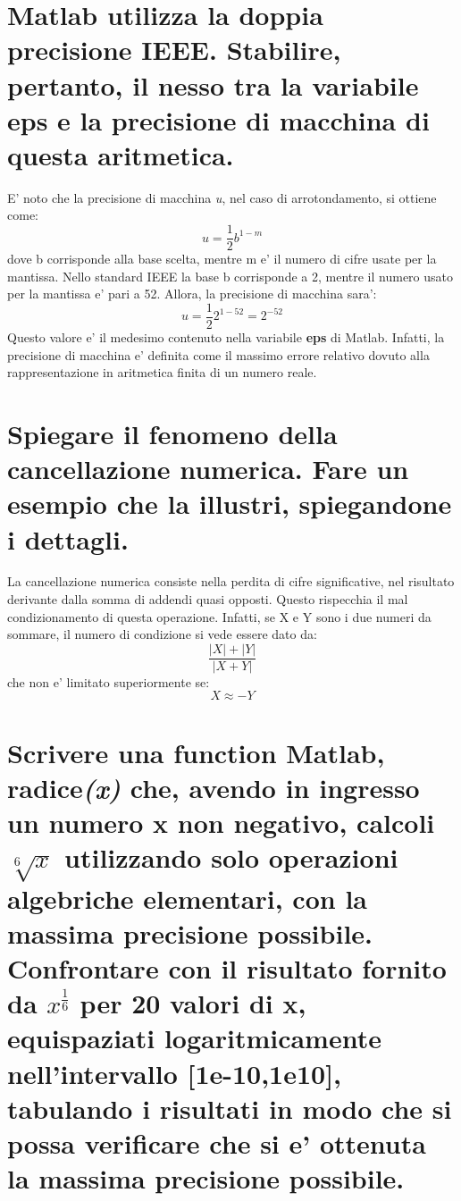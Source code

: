 \documentclass[10pt,a4paper]{article}
\begin{document}
\section{Matlab utilizza la doppia precisione IEEE. Stabilire, pertanto,
  il nesso tra la variabile eps e la precisione di macchina di questa aritmetica.}

E' noto che la precisione di macchina \textit{u}, nel caso di arrotondamento, si ottiene come: \textit{\[u =\frac{1}{2}b^{1-m}\]}
dove b corrisponde alla base scelta, mentre m e' il numero di cifre usate per la mantissa. Nello standard IEEE la base b corrisponde a 2,
mentre il numero usato per la mantissa e' pari a 52. Allora, la precisione di macchina sara':  \textit{\[u =\frac{1}{2}2^{1-52}=2^{-52}\]}
Questo valore e' il medesimo contenuto nella variabile \textbf{eps} di Matlab.
Infatti, la precisione di macchina e' definita come il massimo errore relativo dovuto alla rappresentazione in aritmetica finita di un numero reale.

\section{Spiegare il fenomeno della cancellazione numerica. Fare un esempio che la illustri, spiegandone i dettagli.}

La cancellazione numerica consiste nella perdita di cifre
significative, nel risultato derivante dalla somma di addendi
quasi opposti. Questo rispecchia il mal condizionamento di
questa operazione. Infatti, se X e Y sono i due numeri da sommare,
il numero di condizione si vede essere dato da:
\[
  \frac{|X| + |Y|}{|X + Y|}
\] che non e' limitato superiormente se: $$ X \approx -Y $$

\section{Scrivere una function Matlab, radice\textit{(x)} che, avendo in ingresso un numero x non negativo,
calcoli $ \sqrt[6]{x} $ utilizzando solo operazioni algebriche elementari, con la massima precisione possibile.
Confrontare con il risultato fornito da $ x^{\frac{1}{6}} $ per 20 valori di x, equispaziati logaritmicamente nell'intervallo [1e-10,1e10],
tabulando i risultati in modo che si possa verificare che si e' ottenuta la massima precisione possibile.}
\end{document}

